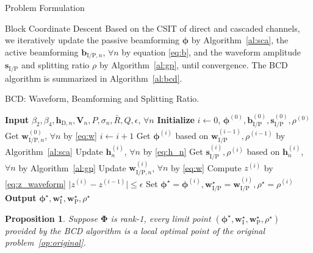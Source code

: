 \documentclass[journal]{IEEEtran}
\newtheorem{proposition}{Proposition}
\begin{document}
\begin{section}{Problem Formulation}
		\begin{subsection}{Block Coordinate Descent}
			Based on the CSIT of direct and cascaded channels, we iteratively update the passive beamforming $\boldsymbol{\phi}$ by Algorithm~\ref{al:sca}, the active beamforming $\boldsymbol{b}_{\mathrm{I/P},n}$, $\forall n$ by equation \eqref{eq:b}, and the waveform amplitude $\boldsymbol{s}_{\mathrm{I/P}}$ and splitting ratio $\rho$ by Algorithm~\ref{al:gp}, until convergence. The BCD algorithm is summarized in Algorithm~\ref{al:bcd}.
			\begin{algorithm}[!t]
				\caption{BCD: Waveform, Beamforming and Splitting Ratio.}
				\label{al:bcd}
				\begin{algorithmic}[1]
					\State \textbf{Input} $\beta_2,\beta_4,\boldsymbol{h}_{\mathrm{D},n},\boldsymbol{V}_{n},P,\sigma_n,\bar{R},Q,\epsilon$, $\forall n$
					\State \textbf{Initialize} $i \gets 0$, $\boldsymbol{\phi}^{(0)},\boldsymbol{b}_{\mathrm{I/P}}^{(0)},\boldsymbol{s}_{\mathrm{I/P}}^{(0)},\rho^{(0)}$
					\State Get $\boldsymbol{w}_{\mathrm{I/P},n}^{(0)}$, $\forall n$ by \eqref{eq:w}
					\Repeat
						\State $i \gets i + 1$
						\State Get $\boldsymbol{\phi}^{(i)}$ based on $\boldsymbol{w}_{\mathrm{I/P}}^{(i-1)},\rho^{(i-1)}$ by Algorithm~\ref{al:sca}
						\State Update $\boldsymbol{h}_n^{(i)}$, $\forall n$ by \eqref{eq:h_n}
						\State Get $\boldsymbol{s}_{\mathrm{I/P}}^{(i)},\rho^{(i)}$ based on $\boldsymbol{h}_n^{(i)}$, $\forall n$ by Algorithm~\ref{al:gp}
						\State Update $\boldsymbol{w}_{\mathrm{I/P},n}^{(i)}$, $\forall n$ by \eqref{eq:w}
						\State Compute $z^{(i)}$ by \eqref{eq:z_waveform}
					\Until $\lvert z^{(i)} - z^{(i-1)} \rvert \le \epsilon$
					\State Set $\boldsymbol{\phi}^{\star}=\boldsymbol{\phi}^{(i)},\boldsymbol{w}_{\mathrm{I/P}}^{\star}=\boldsymbol{w}_{\mathrm{I/P}}^{(i)},\rho^{\star}=\rho^{(i)}$
					\State \textbf{Output} $\boldsymbol{\phi}^{\star},\boldsymbol{w}_{\mathrm{I}}^{\star},\boldsymbol{w}_{\mathrm{P}}^{\star},\rho^{\star}$
				\end{algorithmic}
			\end{algorithm}

			\begin{proposition}\label{pr:bcd}
				Suppose $\boldsymbol{\Phi}$ is rank-\num{1}, every limit point $(\boldsymbol{\phi}^{\star},\boldsymbol{w}_{\mathrm{I}}^{\star},\boldsymbol{w}_{\mathrm{P}}^{\star},\rho^{\star})$ provided by the BCD algorithm is a local optimal point of the original problem~\eqref{op:original}.
			\end{proposition}


\end{subsection}
\end{section}
\end{document}
